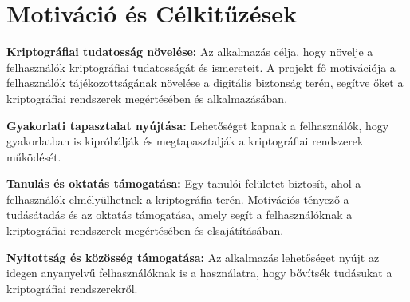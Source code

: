 \section {Motiváció és Célkitűzések}
\textbf{Kriptográfiai tudatosság növelése:}
Az alkalmazás célja, hogy növelje a felhasználók kriptográfiai tudatosságát és ismereteit. A projekt fő motivációja a felhasználók tájékozottságának növelése a digitális biztonság terén, segítve őket a kriptográfiai rendszerek megértésében és alkalmazásában.

\textbf{Gyakorlati tapasztalat nyújtása:}
Lehetőséget kapnak a felhasználók, hogy gyakorlatban is kipróbálják és megtapasztalják a kriptográfiai rendszerek működését.

\textbf{Tanulás és oktatás támogatása:}
Egy tanulói felületet biztosít, ahol a felhasználók elmélyülhetnek a kriptográfia terén. Motivációs tényező a tudásátadás és az oktatás támogatása, amely segít a felhasználóknak a kriptográfiai rendszerek megértésében és elsajátításában.

\textbf{Nyitottság és közösség támogatása:}
Az alkalmazás lehetőséget nyújt az idegen anyanyelvű felhasználóknak is a használatra, hogy bővítsék tudásukat a kriptográfiai rendszerekről.






